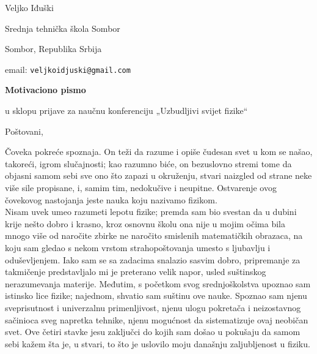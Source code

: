 \documentclass[a4paper]{article}
\begin{document}
\noindent Veljko Iđuški

\noindent Srednja tehnička škola Sombor

 Sombor, Republika Srbija

\noindent email: \verb!veljkoidjuski@gmail.com!\\

\vspace{1em}

{\centering \textbf{Motivaciono pismo}

u sklopu prijave za naučnu konferenciju „Uzbudljivi svijet fizike“\\}

\vspace{2em}

{\centering Poštovani,\\}

\vspace{1em}

Čoveka pokreće spoznaja. On teži da razume i opiše čudesan svet u kom se našao, takoreći, igrom slučajnosti; kao razumno biće, on bezuslovno stremi tome da objasni samom sebi sve ono što zapazi u okruženju, stvari naizgled od strane neke više sile propisane, i, samim tim, nedokučive i neupitne. Ostvarenje ovog čovekovog nastojanja jeste nauka koju nazivamo fizikom.\\


Nisam uvek umeo razumeti lepotu fizike; premda sam bio svestan da u dubini krije nešto dobro i krasno, kroz osnovnu školu ona nije u mojim očima bila mnogo više od naročite zbirke ne naročito smislenih matematičkih obrazaca, na koju sam gledao s nekom vrstom strahopoštovanja umesto s ljubavlju i oduševljenjem. Iako sam se sa zadacima snalazio sasvim dobro, pripremanje za takmičenje predstavljalo mi je preterano velik napor, usled suštinskog nerazumevanja materije. Međutim, s početkom svog srednjoškolstva upoznao sam istinsko lice fizike; najednom, shvatio sam suštinu ove nauke. Spoznao sam njenu sveprisutnost i univerzalnu primenljivost, njenu ulogu pokretača i neizostavnog sačinioca sveg napretka tehnike, njenu mogućnost da sistematizuje ovaj neobičan svet. Ove četiri stavke jesu zaključci do kojih sam došao u pokušaju da samom sebi kažem šta je, u stvari, to što je uslovilo moju današnju zaljubljenost u fiziku.\\
\end{document}
